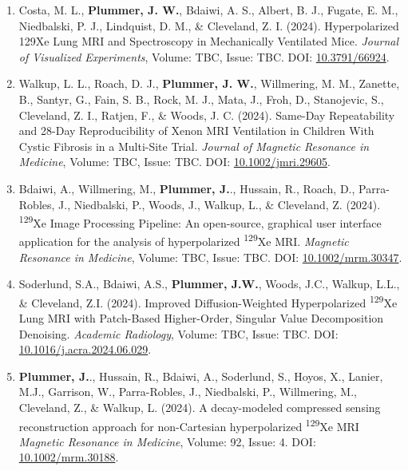 \documentclass[12pt,]{scrartcl}
\begin{document}
\begin{enumerate}
  \leftskip-0.13in %


    \item Costa, M. L., \textbf{Plummer, J. W.}, Bdaiwi, A. S., Albert, B. J., Fugate, E. M., Niedbalski, P. J., Lindquist, D. M., \& Cleveland, Z. I. (2024). Hyperpolarized 129Xe Lung MRI and Spectroscopy in Mechanically Ventilated Mice. \textit{Journal of Visualized Experiments}, Volume: TBC, Issue: TBC. DOI: \href{https://app.jove.com/t/66924/hyperpolarized-129xe-lung-mri-spectroscopy-mechanically-ventilated}{10.3791/66924}.

    \item Walkup, L. L., Roach, D. J., \textbf{Plummer, J. W.}, Willmering, M. M., Zanette, B., Santyr, G., Fain, S. B., Rock, M. J., Mata, J., Froh, D., Stanojevic, S., Cleveland, Z. I., Ratjen, F., \& Woods, J. C. (2024). Same-Day Repeatability and 28-Day Reproducibility of Xenon MRI Ventilation in Children With Cystic Fibrosis in a Multi-Site Trial. \textit{Journal of Magnetic Resonance in Medicine}, Volume: TBC, Issue: TBC. DOI: \href{https://doi.org/10.1002/jmri.29605}{10.1002/jmri.29605}.

    \item Bdaiwi, A., Willmering, M., \textbf{Plummer, J.}., Hussain, R., Roach, D., Parra-Robles, J., Niedbalski, P., Woods, J., Walkup, L., \& Cleveland, Z. (2024). \textsuperscript{129}Xe Image Processing Pipeline: An open-source, graphical user interface application for the analysis of hyperpolarized \textsuperscript{129}Xe MRI. \textit{Magnetic Resonance in Medicine}, Volume: TBC, Issue: TBC. DOI: \href{https://doi.org/10.1002/mrm.30347}{10.1002/mrm.30347}.
  
    \item Soderlund, S.A., Bdaiwi, A.S., \textbf{Plummer, J.W.}, Woods, J.C., Walkup, L.L., \& Cleveland, Z.I. (2024). Improved Diffusion-Weighted Hyperpolarized \textsuperscript{129}Xe Lung MRI with Patch-Based Higher-Order, Singular Value Decomposition Denoising. \textit{Academic Radiology}, Volume: TBC, Issue: TBC. DOI: \href{https://doi.org/10.1016/j.acra.2024.06.029}{10.1016/j.acra.2024.06.029}.
  
    \item  \textbf{Plummer, J.}., Hussain, R., Bdaiwi, A., Soderlund, S., Hoyos, X., Lanier, M.J., Garrison, W., Parra-Robles, J., Niedbalski, P., Willmering, M., Cleveland, Z., \& Walkup, L. (2024). A decay-modeled compressed sensing reconstruction approach for non-Cartesian hyperpolarized \textsuperscript{129}Xe MRI \textit{Magnetic Resonance in Medicine}, Volume: 92, Issue: 4.
    DOI: \href{https://doi.org/10.1002/mrm.30188}{10.1002/mrm.30188}.


\end{enumerate}
\end{document}
